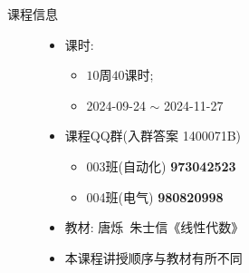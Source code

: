 \begin{frame}[<*>]{课程信息}
	\begin{figure}[bpt]
		\begin{minipage}{.65\textwidth}
			\begin{itemize}
				\item 课时:
					\begin{itemize}
						\item $10$周$40$课时;
						\item 2024-09-24 $\sim$ 2024-11-27
					\end{itemize}
				\item 课程QQ群(入群答案 1400071B)
					\begin{itemize}
						\item 003班(自动化) \alert{\textbf{973042523}}
						\item 004班(电气) \alert{\textbf{980820998}}
					\end{itemize}
				\item 教材: 唐烁\ 朱士信《线性代数》
				\item \alert{本课程讲授顺序与教材有所不同}
			\end{itemize}
		\end{minipage}
		\begin{minipage}{.3\textwidth}
		\end{minipage}
	\end{figure}
\end{frame}


